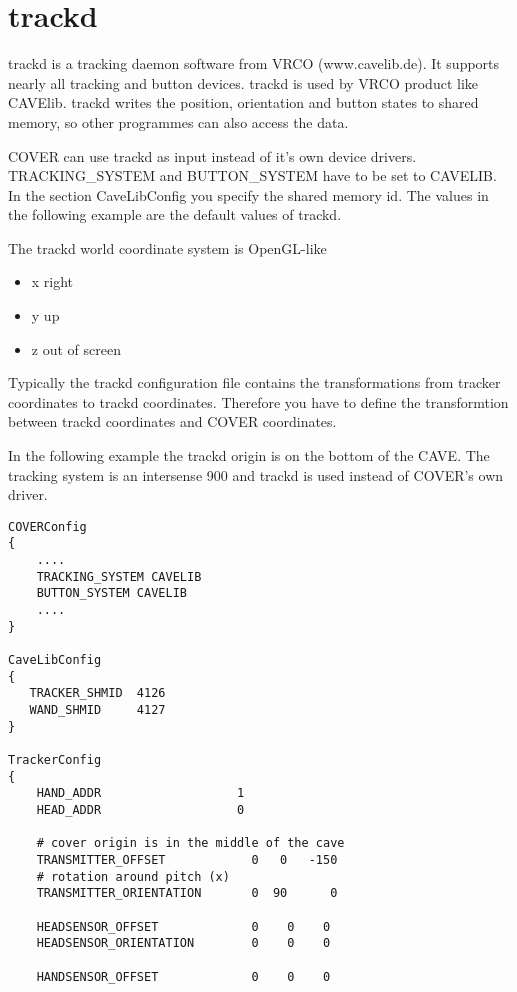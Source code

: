 \section{trackd}
trackd is a tracking daemon software from VRCO (www.cavelib.de).
It supports nearly all tracking and button devices. trackd is used by
VRCO product like CAVElib. trackd writes the position, orientation
and button states to shared memory, so other programmes can also access
the data.

COVER can use trackd as input instead of it's own device drivers.
TRACKING\_SYSTEM and BUTTON\_SYSTEM have to be set to CAVELIB. In the
section CaveLibConfig you specify the shared memory id. The values
in the following example are the default values of trackd.

The trackd world coordinate system is OpenGL-like
\begin{itemize}
\item x right
\item y up
\item z out of screen
\end{itemize}
Typically the trackd configuration file contains the transformations
from tracker coordinates to trackd coordinates. Therefore you have
to define the transformtion between trackd coordinates and COVER coordinates.

In the following example the trackd origin is on the bottom of the CAVE.
The tracking system is an intersense 900 and trackd is used instead of
COVER's own driver.

\small \begin{verbatim}
COVERConfig
{
    ....
    TRACKING_SYSTEM CAVELIB
    BUTTON_SYSTEM CAVELIB
    ....
}

CaveLibConfig
{
   TRACKER_SHMID  4126
   WAND_SHMID     4127
}

TrackerConfig
{
    HAND_ADDR                   1
    HEAD_ADDR                   0

    # cover origin is in the middle of the cave
    TRANSMITTER_OFFSET            0   0   -150
    # rotation around pitch (x)
    TRANSMITTER_ORIENTATION       0  90      0

    HEADSENSOR_OFFSET             0    0    0
    HEADSENSOR_ORIENTATION        0    0    0

    HANDSENSOR_OFFSET             0    0    0
 
\end{verbatim} \normalsize

\clearpage


